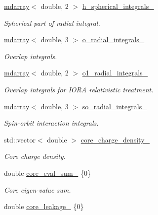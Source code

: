 \begin{DoxyCompactItemize}
\hyperlink{classsddk_1_1mdarray}{mdarray}$<$ double, 2 $>$ \hyperlink{classsirius_1_1_atom__symmetry__class_a67ce6c9408276241634a0108beb18ce1}{h\+\_\+spherical\+\_\+integrals\+\_\+}
\begin{DoxyCompactList}\small\item\em Spherical part of radial integral. \end{DoxyCompactList}\item 
\hyperlink{classsddk_1_1mdarray}{mdarray}$<$ double, 3 $>$ \hyperlink{classsirius_1_1_atom__symmetry__class_aee287b3e0ec23fb68ecb742490ca1fdb}{o\+\_\+radial\+\_\+integrals\+\_\+}
\begin{DoxyCompactList}\small\item\em Overlap integrals. \end{DoxyCompactList}\item 
\hyperlink{classsddk_1_1mdarray}{mdarray}$<$ double, 2 $>$ \hyperlink{classsirius_1_1_atom__symmetry__class_a5b103e070ac0676a0ce627a8ce654b75}{o1\+\_\+radial\+\_\+integrals\+\_\+}
\begin{DoxyCompactList}\small\item\em Overlap integrals for I\+O\+R\+A relativistic treatment. \end{DoxyCompactList}\item 
\hyperlink{classsddk_1_1mdarray}{mdarray}$<$ double, 3 $>$ \hyperlink{classsirius_1_1_atom__symmetry__class_a3320c301ad81367c8a6ce0492150b8c1}{so\+\_\+radial\+\_\+integrals\+\_\+}
\begin{DoxyCompactList}\small\item\em Spin-\/orbit interaction integrals. \end{DoxyCompactList}\item 
std\+::vector$<$ double $>$ \hyperlink{classsirius_1_1_atom__symmetry__class_ab22e12fabcf60d92a06b5899e6897ba0}{core\+\_\+charge\+\_\+density\+\_\+}
\begin{DoxyCompactList}\small\item\em Core charge density. \end{DoxyCompactList}\item 
double \hyperlink{classsirius_1_1_atom__symmetry__class_a1a83d41a210d9c10ee27ac15ae6dd945}{core\+\_\+eval\+\_\+sum\+\_\+} \{0\}
\begin{DoxyCompactList}\small\item\em Core eigen-\/value sum. \end{DoxyCompactList}\item 
double \hyperlink{classsirius_1_1_atom__symmetry__class_a511011ad2a11f0ff95ba77c7801bcdac}{core\+\_\+leakage\+\_\+} \{0\}

\end{DoxyCompactItemize}
